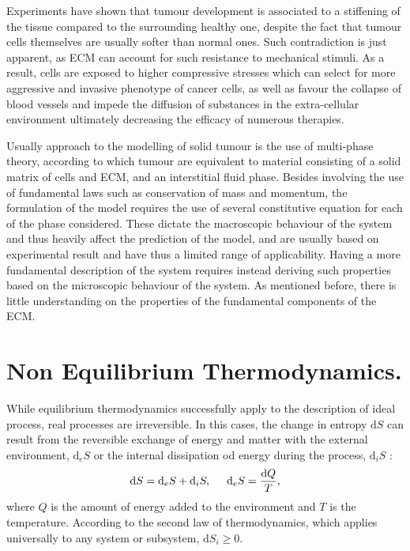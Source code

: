 \documentclass[runningheads]{llncs}
\renewcommand{\d}{\ensuremath{\text{d}}}
\begin{document}
Experiments have shown that tumour development is associated to a stiffening of the tissue compared to the surrounding healthy one, despite the fact that tumour cells themselves are usually softer than normal ones. Such contradiction is just apparent, as ECM can account for such resistance to mechanical stimuli. As a result, cells are exposed to higher compressive stresses which can select for more aggressive and invasive phenotype of cancer cells, as well as favour the collapse of blood vessels and impede the diffusion of substances in the extra-cellular environment ultimately decreasing the efficacy of numerous therapies.

Usually approach to the modelling of solid tumour is the use of multi-phase theory, according to which tumour are equivalent to material consisting of a solid matrix of cells and ECM, and an interstitial fluid phase. Besides involving the use of fundamental laws such as conservation of mass and momentum, the formulation of the model requires the use of several constitutive equation for each of the phase considered. These dictate the macroscopic behaviour of the system and thus heavily affect the prediction of the model, and are usually based on experimental result and have thus a limited range of applicability. Having a more fundamental description of the system requires instead deriving such properties based on the microscopic behaviour of the system.   As mentioned before, there is little understanding on the properties of the fundamental components of the ECM.

\section{Non Equilibrium Thermodynamics.}
\label{secNET}
While equilibrium thermodynamics successfully apply to the description of ideal process, real processes are irreversible. In this cases, the change in entropy $\d S$ can result from the reversible exchange of energy and matter with the external environment, $\d_eS$ or the internal dissipation od energy during the process, $\d_iS$ \cite{NET}:
\begin{equation}
\d S = \d_eS + \d_iS, \hspace{5mm} \d_eS= \frac{\d Q}{T},
\end{equation}
where $Q$ is the amount of energy added to the environment and $T$ is the temperature. 
According to the second law of thermodynamics, which applies universally to any system or subsystem, $\d S_i\ge 0$.
\end{document}
